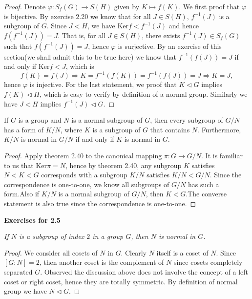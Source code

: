 \begin{proof}
Denote $\varphi:S_f(G)\to S(H)$ given by $K\mapsto f(K)$. We first proof that $\varphi$ is bijective. By exercise 2.20 we know that for all $J\in S(H)$, $f^{-1}(J)$ is a subgroup of $G$. Since $J<H$, we have $\mathrm{Ker}f<f^{-1}(J)$ and hence $f(f^{-1}(J))=J$. That is, for all $J\in S(H)$, there exists $f^{-1}(J)\in S_f(G)$ such that $f(f^{-1}(J))=J$, hence $\varphi$ is surjective. By an exercise of this section(we shall admit this to be true here) we know that $f^{-1}(f(J))=J$ if and only if $\mathrm{Ker}f<J$, which is
$$
f\left( K \right) =f\left( J \right) \Rightarrow K=f^{-1}\left( f\left( K \right) \right) =f^{-1}\left( f\left( J \right) \right) =J\Rightarrow K=J,
$$
hence $\varphi$ is injective. For the last statement, we proof that $K\lhd G$ implies $f(K)\lhd H$, which is easy to verify by definition of a normal group. Similarly we have $J\lhd H$ implies $f^{-1}(J)\lhd G$.
\end{proof}
\begin{corollary}
If $G$ is a group and $N$ is a normal subgroup of $G$, then every subgroup of $G/N$ has a form of $K/N$, where $K$ is a subgroup of $G$ that contains $N$. Furthermore, $K/N$ is normal in $G/N$ if and only if $K$ is normal in $G$.
\end{corollary}
\begin{proof}
Apply theorem 2.40 to the canonical mapping $\pi:G\to G/N$. It is familiar to us that $\mathrm{Ker}\pi=N$, hence by theorem 2.40, any subgroup $K$ satisfies $N<K<G$ corresponds with a subgroup $K/N$ satisfies $K/N<G/N$. Since the correspondence is one-to-one, we know all subgroups of $G/N$ has such a form.Also if $K/N$ is a normal subgroup of $G/N$, then $K\lhd G$.The converse statement is also true since the correspondence is one-to-one.
\end{proof}
\begin{center}
\begin{large}
    \textbf{Exercises for 2.5}
\end{large}
\end{center}
\begin{problem}\em
If $N$ is a subgroup of index $2$ in a group $G$, then $N$ is normal in $G$.
\end{problem}
\begin{proof}
We consider all cosets of $N$ in $G$. Clearly $N$ itself is a coset of $N$. Since $[G:N]=2$, then another coset is the complement of $N$ since cosets completely separated $G$. Observed the discussion above does not involve the concept of a left coset or right coset, hence they are totally symmetric. By definition of normal group we have $N\lhd G$.
\end{proof}
